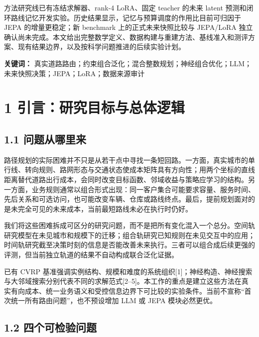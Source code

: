 \documentclass[UTF8,10pt,a4paper,fontset=fandol]{ctexart}
\begin{document}
方法研究线已有冻结求解器、rank-4 LoRA、固定 teacher 的未来 latent 预测和闭环路线记忆开发实验。历史结果显示，记忆与预算调度的作用比目前可归因于 JEPA 的增量更稳定；新 benchmark 上的正式未来快照比较与 JEPA/\allowbreak{}LoRA 独立确认尚未完成。本文给出完整数学定义、数据构建与重建方法、基线准入和测评方案、现有结果边界，以及按科学问题推进的后续实验计划。


\textbf{关键词：} 真实道路路由；约束组合泛化；混合整数规划；神经组合优化；LLM；未来快照决策；JEPA；LoRA；数据来源审计


\clearpage\begingroup\small\linespread{1.05}\selectfont\tableofcontents\endgroup\clearpage

\section*{1 引言：研究目标与总体逻辑}


\subsection*{1.1 问题从哪里来}


路径规划的实际困难并不只是从若干点中寻找一条短回路。一方面，真实城市的单行线、转向规则、路网形态与交通状态使成本矩阵具有方向性；用两个坐标的直线距离替代道路出行成本，会同时改变目标函数、邻域收益与策略应学习的结构。另一方面，业务规则通常以组合形式出现：同一客户集合可能要求容量、服务时间、先后关系和可选访问，也可能改变车辆、仓库或路线终点。最后，提前规划面对的是未完全可见的未来成本，当前最短路线未必在执行时仍好。


我们将这些困难拆成可区分的研究问题，而不是把所有变化混入一个总分。空间轨研究模型在未见城市和规模下的迁移；组合轨研究已知规则在未见交互中的应用；时间轨研究截至决策时刻的信息是否能改善未来执行。三者可以组合成后续更强的评测，但当前独立轨道的结果不自动构成联合泛化证据。


已有 CVRP 基准强调实例结构、规模和难度的系统组织[1]；神经构造、神经搜索与大邻域搜索分别代表不同的求解范式[2–5]。本工作的重点是建立这些方法在真实有向成本、统一业务语义和受控信息边界下可比较的实验条件。当前不宣称“首次统一所有路由问题”，也不预设增加 LLM 或 JEPA 模块必然更优。


\subsection*{1.2 四个可检验问题}
\end{document}
